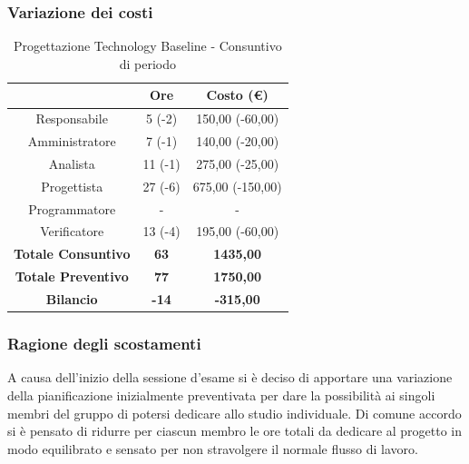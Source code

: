 \subsubsection{Variazione dei costi} \label{subsubsection:variazione_costi_TB}

\begin{table}[H]
  \centering
  \renewcommand{\arraystretch}{1.8}
  \begin{tabular}{c|c|c}
    \rowcolor[HTML]{125E28}
    \multicolumn{1}{c}{\color[HTML]{FFFFFF}\textbf{Ruolo}} &
    \multicolumn{1}{c}{\color[HTML]{FFFFFF}\textbf{Ore}}   &
    \multicolumn{1}{c}{\color[HTML]{FFFFFF}\textbf{Costo (€)}}                               \\
    \hline
    Responsabile                                           & 5 (-2)       & 150,00 (-60,00)  \\
    Amministratore                                         & 7 (-1)       & 140,00 (-20,00)  \\
    Analista                                               & 11 (-1)      & 275,00 (-25,00)  \\
    Progettista                                            & 27 (-6)      & 675,00 (-150,00) \\
    Programmatore                                          & -            & -                \\
    Verificatore                                           & 13 (-4)      & 195,00 (-60,00)  \\
    \textbf{Totale Consuntivo}                             & \textbf{63}  & \textbf{1435,00} \\
    \textbf{Totale Preventivo}                             & \textbf{77}  & \textbf{1750,00} \\
    \textbf{Bilancio}                                      & \textbf{-14} & \textbf{-315,00} \\
  \end{tabular}
  \caption{Progettazione Technology Baseline - Consuntivo di periodo}
\end{table}


\subsubsection{Ragione degli scostamenti} \label{subsubsection:ragione_scostamenti_TB}
A causa dell'inizio della sessione d'esame si è deciso di apportare una variazione della pianificazione inizialmente preventivata per dare la possibilità ai singoli membri del gruppo di potersi dedicare allo studio individuale.
Di comune accordo si è pensato di ridurre per ciascun membro le ore totali da dedicare al progetto in modo equilibrato e sensato per non stravolgere il normale flusso di lavoro.

